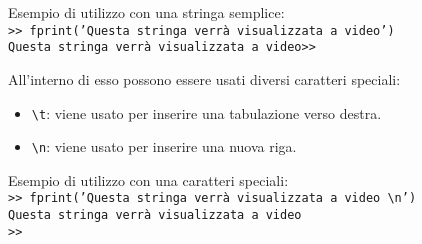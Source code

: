 \documentclass[12pt,a4paper,oneside]{book}
\begin{document}
Esempio di utilizzo con una stringa semplice: \\
\texttt{>> fprint('Questa stringa verrà visualizzata a video')} \\
\texttt{Questa stringa verrà visualizzata a video>>}
\break
			
All'interno di esso possono essere usati diversi caratteri speciali:
\begin{itemize}
	\item	\texttt{\textbackslash t}: viene usato per inserire una tabulazione verso destra.
	\item	\texttt{\textbackslash n}: viene usato per inserire una nuova riga.
\end{itemize}

Esempio di utilizzo con una caratteri speciali: \\
\texttt{>> fprint('Questa stringa verrà visualizzata a video \textbackslash n')} \\
\texttt{Questa stringa verrà visualizzata a video} \\
\texttt{>>}
\break
\end{document}

